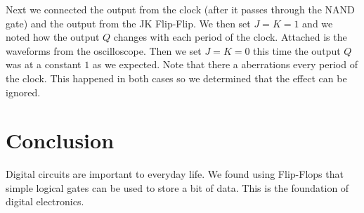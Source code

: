 \documentclass[11pt]{article}
\numberwithin{equation}{section}
\numberwithin{figure}{section}
\numberwithin{table}{section}
\begin{document}
Next we connected the output from the clock (after it passes through the NAND gate) and the output from the JK Flip-Flip. We then set $J=K=1$ and we noted how the output $Q$ changes with each period of the clock. Attached is the waveforms from the oscilloscope. Then we set $J=K=0$ this time the output $Q$ was at a constant $1$ as we expected. Note that there a aberrations every period of the clock. This happened in both cases so we determined that the effect can be ignored.

\section{Conclusion}
Digital circuits are important to everyday life. We found using Flip-Flops that simple logical gates can be used to store a bit of data. This is the foundation of digital electronics.
\end{document}
